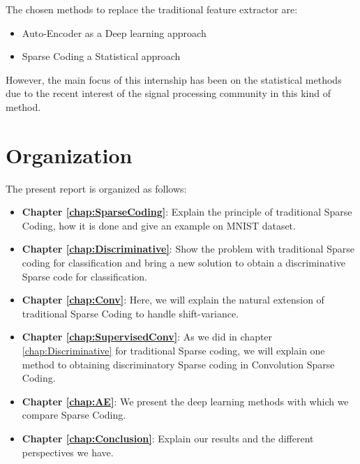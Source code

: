 
The chosen methods to replace the traditional feature extractor are:
\begin{itemize}
 \item Auto-Encoder as a Deep learning approach
\item  Sparse Coding a Statistical approach
\end{itemize}
However, the main focus of this internship has been on the statistical methods due to the recent interest of the signal processing community in this kind of method.
\section{Organization}
The present report is organized as follows:
\begin{itemize}
 \item  \textbf{Chapter \ref{chap:SparseCoding}}:  Explain the principle of traditional Sparse Coding, how it is done and give an example on MNIST dataset.
 \item \textbf{Chapter \ref{chap:Discriminative}}: Show the problem with traditional Sparse coding for classification and bring a new solution to obtain a discriminative Sparse code for classification.
 \item \textbf{Chapter \ref{chap:Conv}}: Here, we will explain the natural extension of traditional Sparse Coding to handle shift-variance.
 \item \textbf{Chapter \ref{chap:SupervisedConv}}: As we did in chapter \ref{chap:Discriminative} for traditional Sparse coding, we will explain one method to obtaining discriminatory Sparse coding in Convolution Sparse Coding.
 \item \textbf{Chapter \ref{chap:AE}}: We present the deep learning methods with which we compare Sparse Coding.
 \item \textbf{Chapter \ref{chap:Conclusion}}: Explain our results and the different perspectives we have.
\end{itemize}

